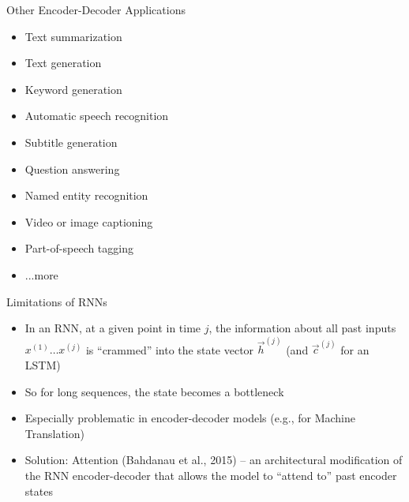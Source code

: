 
\begin{vbframe}{Other Encoder-Decoder Applications}

\vfill

\begin{itemize}
	\item Text summarization
	\item Text generation
	\item Keyword generation
	\item Automatic speech recognition
	\item Subtitle generation
	\item Question answering
	\item Named entity recognition
	\item Video or image captioning
	\item Part-of-speech tagging
	\item ...more
\end{itemize}

\vfill

\end{vbframe}


\begin{vbframe}{Limitations of RNNs}

\vfill

\begin{itemize}
	\item In an RNN, at a given point in time $j$, the information about all past inputs $x^{(1)} \ldots x^{(j)}$ is ``crammed'' into the state vector $\vec h^{(j)}$ (and $\vec c^{(j)}$ for an LSTM)
	\item So for long sequences, the state becomes a bottleneck
	\item Especially problematic in encoder-decoder models (e.g., for Machine Translation)
	\item Solution: Attention (Bahdanau et al., 2015) -- an architectural modification of the RNN encoder-decoder that allows the model to ``attend to'' past encoder states
\end{itemize}

\vfill

\end{vbframe}


